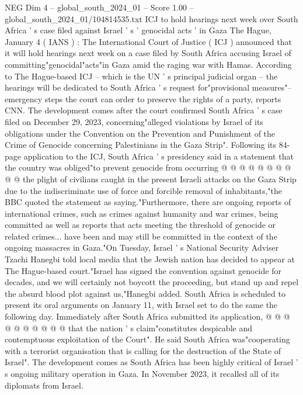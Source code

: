 \begin{textsample}{NEG Dim 4 – global\_south\_2024\_01 – Score 1.00 – global\_south\_2024\_01/104814535.txt}  \label{ex:f4_neg_089}
ICJ to hold hearings next week over South Africa ' s case filed against Israel ' s ' genocidal acts ' in Gaza The Hague, January 4 ( IANS ) : The International Court of Justice ( ICJ ) announced that it will hold hearings next week on a case filed by South Africa accusing Israel of committing"genocidal"acts"in Gaza amid the raging war with Hamas.
According to The Hague-based ICJ -- which is the UN ' s principal judicial organ -- the hearings will be dedicated to South Africa ' s request for"provisional measures"-- emergency steps the court can order to preserve the rights of a party, reports CNN.
The development comes after the court confirmed South Africa ' s case filed on December 29, 2023, concerning"alleged violations by Israel of its obligations under the Convention on the Prevention and Punishment of the Crime of Genocide concerning Palestinians in the Gaza Strip".
Following its 84-page application to the ICJ, South Africa ' s presidency said in a statement that the country was obliged"to prevent genocide from occurring @ @ @ @ @ @ @ @ @ @ the plight of civilians caught in the present Israeli attacks on the Gaza Strip due to the indiscriminate use of force and forcible removal of inhabitants,"the BBC quoted the statement as saying."Furthermore, there are ongoing reports of international crimes, such as crimes against humanity and war crimes, being committed as well as reports that acts meeting the threshold of genocide or related crimes... have been and may still be committed in the context of the ongoing massacres in Gaza."On Tuesday, Israel ' s National Security Adviser Tzachi Hanegbi told local media that the Jewish nation has decided to appear at The Hague-based court."Israel has signed the convention against genocide for decades, and we will certainly not boycott the proceeding, but stand up and repel the absurd blood plot against us,"Hanegbi added.
South Africa is scheduled to present its oral arguments on January 11, with Israel set to do the same the following day.
Immediately after South Africa submitted its application, @ @ @ @ @ @ @ @ @ @ that the nation ' s claim"constitutes despicable and contemptuous exploitation of the Court".
He said South Africa was"cooperating with a terrorist organisation that is calling for the destruction of the State of Israel".
The development comes as South Africa has been highly critical of Israel ' s ongoing military operation in Gaza.
In November 2023, it recalled all of its diplomats from Israel.

\end{textsample}
